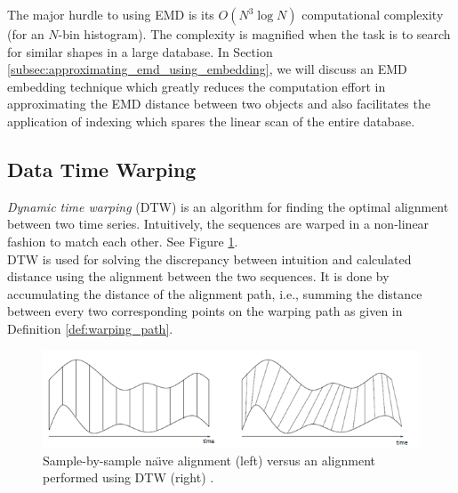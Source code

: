 \iftoggle{edit-mode}{\hspace{0pt}\marginpar{EMD drawback}}{}
The major hurdle to using EMD is its $O\left( {{N^3}\log N} \right)$ computational complexity (for an $N$-bin histogram). 
The complexity is magnified when the task is to search for similar shapes in a large database.  
In Section \ref{subsec:approximating_emd_using_embedding}, we will discuss an EMD embedding technique which greatly reduces the computation effort in approximating the EMD distance between two objects and also facilitates the application of indexing which spares the linear scan of the entire database.



\subsection{Data Time Warping}
\label{subsec:dtw}

\iftoggle{edit-mode}{\hspace{0pt}\marginpar{Introduction}}{}
\emph{Dynamic time warping} (DTW) is an algorithm for finding the optimal alignment between two time series. 
Intuitively, the sequences are warped in a non-linear fashion to match each other. 
See Figure \ref{fig:dtw_dequence_demo}.\\ 


DTW is used for solving the discrepancy between intuition and calculated distance using the alignment between the two sequences. 
It is done by accumulating the distance of the alignment path, i.e., summing the distance between every two corresponding points on the warping path as given in Definition \ref{def:warping_path}. 

\begin{figure}
\centering
\includegraphics[width=1\textwidth]{./figures/dtw_dequence_demo}      
\caption{Sample-by-sample na\"{\i}ve alignment (left) versus an alignment performed using DTW (right) \cite{rath2003word}.}
\label{fig:dtw_dequence_demo}
\end{figure}

